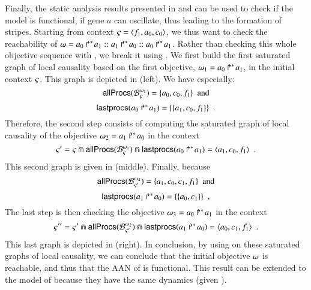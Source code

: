 Finally, the static analysis results presented in
 and  can be used to check if the model is functional,
\ie if gene $a$ can oscillate, thus leading to the formation of stripes.
Starting from context $\ctx = \PHstate{f_1, a_0, c_0}$,
we thus want to check the reachability of
$\w = \PHobj{a_0}{a_1} \PHconcat \PHobj{a_1}{a_0} \PHconcat \PHobj{a_0}{a_1}$.
Rather than checking this whole objective sequence with ,
we break it using .
We first build the first saturated graph of local causality
based on the first objective, $\w_1 = \PHobj{a_0}{a_1}$, in the initial context $\ctx$.
This graph is depicted in (left).
We have especially:
\[\allprocs(\thisB{\w_1}{\ctx}) = \{ a_0, c_0, f_1 \} \enspace \text{and}\]
\[\lastprocs(\PHobj{a_0}{a_1}) = \{\{ a_1, c_0, f_1 \}\} \enspace.\]
Therefore, the second step consists of computing the saturated graph of local causality
of the objective $\w_2 = \PHobj{a_1}{a_0}$
in the context
\[\ctx' = \ctx \Cap \allprocs(\thisB{\w_1}{\ctx}) \Cap \lastprocs(\PHobj{a_0}{a_1}) = \PHstate{a_1, c_0, f_1} \enspace.\]
This second graph is given in (middle).
Finally, because
\[\allprocs(\thisB{\w_2}{\ctx'}) = \{ a_1, c_0, c_1, f_1 \} \enspace \text{and}\]
\[\lastprocs(\PHobj{a_1}{a_0}) = \{\{ a_0, c_1 \}\} \enspace,\]
The last step is then checking
the objective $\w_3 = \PHobj{a_0}{a_1}$
in the context
\[\ctx'' = \ctx' \Cap \allprocs(\thisB{\w_2}{\ctx'}) \Cap \lastprocs(\PHobj{a_1}{a_0}) = \PHstate{a_0, c_1, f_1} \enspace.\]
This last graph is depicted in (right).
In conclusion, by using  on these saturated graphs of local causality,
we can conclude that the initial objective $\w$ is reachable,
and thus that the AAN of  is functional.
This result can be extended to the model of 
because they have the same dynamics (given ).

